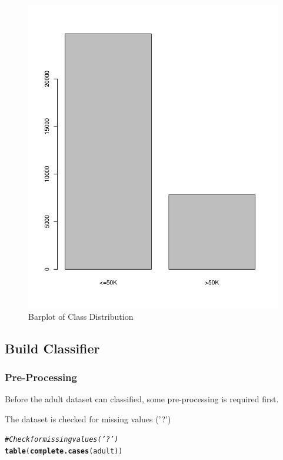 \documentclass[10pt  ,usenames, dvipsnames]{article}\usepackage[]{graphicx}\usepackage[]{color}
\makeatletter
\newcommand{\hlcom}[1]{\textcolor[rgb]{0.678,0.584,0.686}{\textit{#1}}}%
\newcommand{\hlstd}[1]{\textcolor[rgb]{0.345,0.345,0.345}{#1}}%
\newcommand{\hlkwd}[1]{\textcolor[rgb]{0.737,0.353,0.396}{\textbf{#1}}}%
\newenvironment{kframe}{%
 \def\at@end@of@kframe{}%
 \ifinner\ifhmode%
  \def\at@end@of@kframe{\end{minipage}}%
  \begin{minipage}{\columnwidth}%
 \fi\fi%
 \def\FrameCommand##1{\hskip\@totalleftmargin \hskip-\fboxsep
 \colorbox{shadecolor}{##1}\hskip-\fboxsep
     \hskip-\linewidth \hskip-\@totalleftmargin \hskip\columnwidth}%
 \MakeFramed {\advance\hsize-\width
   \@totalleftmargin\z@ \linewidth\hsize
   \@setminipage}}%
 {\par\unskip\endMakeFramed%
 \at@end@of@kframe}
\newenvironment{knitrout}{}{} %
\makeatother
\begin{document}
\begin{figure}[H]
\begin{center}
\begin{knitrout}
\color{fgcolor}
\includegraphics[width=.76\linewidth]{figure/unnamed-chunk-16-1} 

\end{knitrout}
\caption {Barplot of Class Distribution}
\label{fig1}
\end {center}
\end {figure}


\clearpage

\subsection{Build Classifier}

\subsubsection{Pre-Processing}
Before the adult dataset can classified, some pre-processing is required first.

The dataset is checked for missing values ('?')
\begin{knitrout}
\color{fgcolor}\begin{kframe}
\begin{alltt}
\hlcom{#Check for missing values ('?')}
\hlkwd{table}\hlstd{(}\hlkwd{complete.cases} \hlstd{(adult))}
\end{alltt}
\end{kframe}
\end{knitrout}
\end{document}
